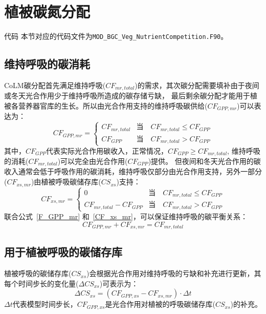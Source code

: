 \section{植被碳氮分配}\label{植被碳氮分配}
\begin{mymdframed}{代码}
本节对应的代码文件为\texttt{MOD\_BGC\_Veg\_NutrientCompetition.F90}。
\end{mymdframed}
\subsection{维持呼吸的碳消耗}
CoLM碳分配首先满足维持呼吸($CF_{mr,total}$)的需求，其次碳分配需要填补由于夜间或冬天光合作用少于维持呼吸所造成的碳存储亏缺，
最后剩余碳分配才能用于植被各营养器官库的生长。所以由光合作用支持的维持呼吸碳供给($CF_{GPP,mr}$)可以表达为：
\begin{equation}\label{F_GPP_mr}
CF_{GPP,mr}=\left\{\begin{array}{cl}CF_{mr, total} & \text{当}\quad CF_{mr, total} \leqslant CF_{GPP} \\ CF_{GPP} & \text{当}\quad CF_{mr,total}>CF_{GPP} \end{array}\right.
\end{equation}
其中，$CF_{GPP}$代表实际光合作用碳收入，正常情况，$CF_{GPP}\geq CF_{mr,total}$,
维持呼吸的消耗($CF_{mr,total}$)可以完全由光合作用($CF_{GPP}$)提供。
但夜间和冬天光合作用的碳收入通常会低于呼吸作用的碳消耗，维持呼吸仅部分由光合作用支持，另外一部分($CF_{xs,mr}$)由植被呼吸碳储存库($CS_{xs}$)支持：
\begin{equation}\label{CF_xs_mr}
CF_{xs, mr}=\left\{\begin{array}{cl}0 & \text{当}\quad CF_{mr, total} \leqslant CF_{GPP} \\ CF_{mr, total}-CF_{GPP} & \text{当}\quad CF_{mr, total}>CF_{GPP}\end{array}\right.
\end{equation}
联合公式~\eqref{F_GPP_mr} 和~\eqref{CF_xs_mr}，可以保证维持呼吸的碳平衡关系：
\begin{equation}
CF_{GPP, mr}+CF_{xs, mr}=CF_{mr, total}
\end{equation}


\subsection{用于植被呼吸的碳储存库}
植被呼吸的碳储存库($CS_{xs}$)会根据光合作用对维持呼吸的亏缺和补充进行更新，其每个时间步长的变化量($\Delta CS_{xs}$)可表示为：
\begin{equation}
\Delta CS_{xs}=\left(CF_{GPP, xs}-CF_{xs, mr}\right) \cdot \Delta t
\end{equation}
$\Delta t$代表模型时间步长，$CF_{GPP,xs}$是光合作用对植被的呼吸碳储存库($CS_{xs}$)的补充。

